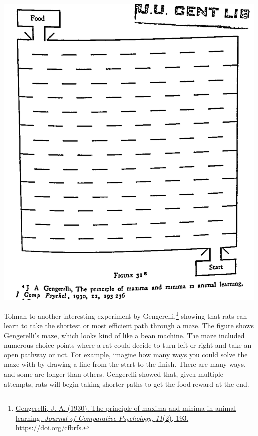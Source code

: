 \documentclass[
  oneside,
  12pt]{crumpbook}
\newenvironment{floatrightbox50}{%
  \wrapfigure{R}{.5\textwidth}%
  }{%
  \endwrapfigure}
\begin{document}
\begin{floatrightbox50}
\includegraphics[width=1\linewidth]{imgs/Tolman_Minima}

\end{floatrightbox50}

Tolman to another interesting experiment by Gengerelli,\footnote{\protect\hyperlink{ref-gengerelliPrincipleMaximaMinima1930}{Gengerelli, J. A. (1930). The principle of maxima and minima in animal learning. \emph{Journal of Comparative Psychology}, \emph{11}(2), 193. \url{https://doi.org/cfbrfs}}.} showing that rats can learn to take the shortest or most efficient path through a maze. The figure shows Gengerelli's maze, which looks kind of like a \href{https://en.wikipedia.org/wiki/Bean_machine}{bean machine}. The maze included numerous choice points where a rat could decide to turn left or right and take an open pathway or not. For example, imagine how many ways you could solve the maze with by drawing a line from the start to the finish. There are many ways, and some are longer than others. Gengerelli showed that, given multiple attempts, rats will begin taking shorter paths to get the food reward at the end.
\end{document}
